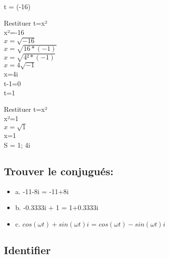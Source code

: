 t = (-16) \\

\vspace{5mm}

Restituer t=x² \\

x²=-16 \\

$x=\sqrt{-16}$ \\

$x=\sqrt{16 * (-1)}$ \\

$x=\sqrt{4² * (-1)}$ \\

$x=4\sqrt{-1}$ \\

x=4i \\

t-1=0 \\
t=1 \\

\vspace{5mm}

Restituer t=x² \\

x²=1 \\
$x=\sqrt{1}$ \\
x=1 \\


S = 1; 4i \\

\newpage

\vspace{3mm} %
\subsection{Trouver le conjugués:}
\vspace{3mm} %

\begin{itemize}
\item {a. -11-8i = -11+8i}
\item {b. -0.3333i + 1 = 1+0.3333i}
\item {c. $cos(\omega t) + sin(\omega t)i$ = $cos(\omega t) - sin(\omega t)i$ }
\end{itemize}


\vspace{3mm} %
\subsection{Identifier \R $  $ \I}
\vspace{3mm} %

